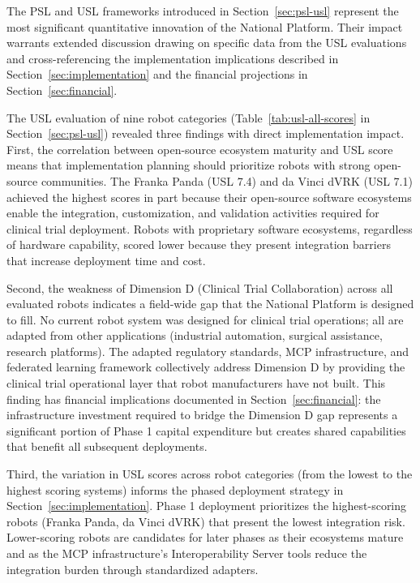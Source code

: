 The PSL and USL frameworks introduced in Section~\ref{sec:psl-usl} represent
the most significant quantitative innovation of the National Platform. Their
impact warrants extended discussion drawing on specific data from the USL
evaluations and cross-referencing the implementation implications described in
Section~\ref{sec:implementation} and the financial projections in
Section~\ref{sec:financial}.

The USL evaluation of nine robot categories (Table~\ref{tab:usl-all-scores}
in Section~\ref{sec:psl-usl}) revealed three findings with direct
implementation impact. First, the correlation between open-source ecosystem
maturity and USL score means that implementation planning should prioritize
robots with strong open-source communities. The Franka Panda (USL 7.4) and
da Vinci dVRK (USL 7.1) achieved the highest scores in part because their
open-source software ecosystems enable the integration, customization, and
validation activities required for clinical trial deployment. Robots with
proprietary software ecosystems, regardless of hardware capability, scored
lower because they present integration barriers that increase deployment time
and cost.

Second, the weakness of Dimension D (Clinical Trial Collaboration) across all
evaluated robots indicates a field-wide gap that the National Platform is
designed to fill. No current robot system was designed for clinical trial
operations; all are adapted from other applications (industrial automation,
surgical assistance, research platforms). The adapted regulatory standards,
MCP infrastructure, and federated learning framework collectively address
Dimension D by providing the clinical trial operational layer that robot
manufacturers have not built. This finding has financial implications
documented in Section~\ref{sec:financial}: the infrastructure investment
required to bridge the Dimension D gap represents a significant portion of
Phase 1 capital expenditure but creates shared capabilities that benefit all
subsequent deployments.

Third, the variation in USL scores across robot categories (from the lowest
to the highest scoring systems) informs the phased deployment strategy in
Section~\ref{sec:implementation}. Phase 1 deployment prioritizes the
highest-scoring robots (Franka Panda, da Vinci dVRK) that present the lowest
integration risk. Lower-scoring robots are candidates for later phases as
their ecosystems mature and as the MCP infrastructure's Interoperability
Server tools reduce the integration burden through standardized adapters.

